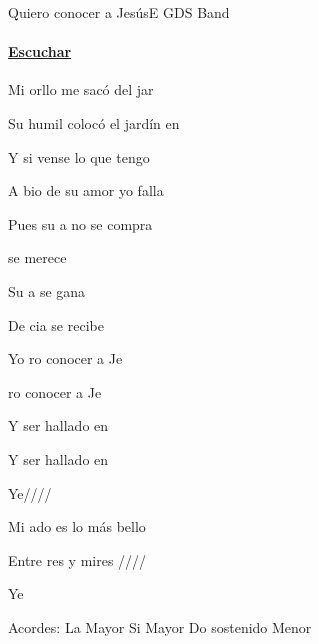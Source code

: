 \documentclass[12pt, spanish]{book}
\begin{document}
    \begin{song}{Quiero conocer a Jesús}{E}
    {} %
    {GDS Band}
    {} %
    {} %
        \ifChordBk
         \paragraph{\mbox{}\hfill\protect\href{https://open.spotify.com/intl-es/track/2NXbzzMlWSFyVXGPhBHDqu}{Escuchar}\mbox{}\hfill}
        \fi


        \begin{SBOpGroup}
            Mi orllo me sacó del jar

            Su humil colocó el jardín en 

            Y si vense lo que tengo

            A bio de su amor yo falla
        \end{SBOpGroup}
        \vskip 20pt
        \begin{SBOpGroup}
            Pues su a no se compra

             se merece

            Su a se gana

            De cia se recibe

            Yo ro conocer a Je

            ro conocer a Je

            Y ser hallado en  

            Y ser hallado en 
        \end{SBOpGroup}
        \vskip 20pt
        \begin{SBOpGroup}
            Ye////

            Mi ado es lo más bello

            Entre res y mires ////

            Ye
        \end{SBOpGroup}

        \ifChordBk
        \begin{SBOpGroup}
            Acordes:\break
            \upchord{\A}\qquad La Mayor \hfill
            \upchord{\B}\qquad Si Mayor \hfill\null\break
            \upchord{\Csm}\qquad Do sostenido Menor \hfill\null\break
        \end{SBOpGroup}
        \fi


\end{song}
\end{document}
